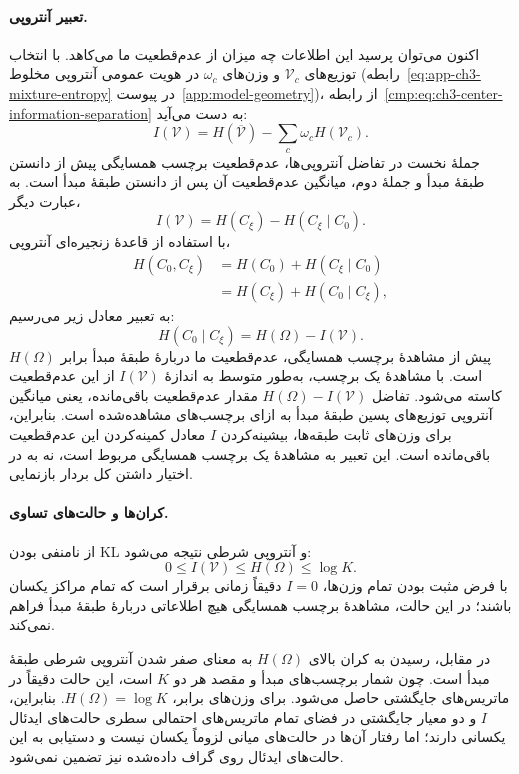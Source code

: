 \paragraph{تعبیر آنتروپی.}
اکنون می‌توان پرسید این اطلاعات چه میزان از
عدم‌قطعیت ما می‌کاهد. با انتخاب توزیع‌های
$\mathcal V_c$ و وزن‌های $\omega_c$ در هویت
عمومی آنتروپی مخلوط
(رابطه~\eqref{eq:app-ch3-mixture-entropy} در
پیوست~\ref{app:model-geometry})، از
رابطه~\eqref{cmp:eq:ch3-center-information-separation}
به دست می‌آید:
\[
I(\mathcal V)
=H(\overline{\mathcal V})-\sum_c\omega_c H(\mathcal V_c).
\]
جملهٔ نخست در تفاضل آنتروپی‌ها، عدم‌قطعیت
برچسب همسایگی پیش از دانستن طبقهٔ مبدأ و
جملهٔ دوم، میانگین عدم‌قطعیت آن پس از دانستن
طبقهٔ مبدأ است. به عبارت دیگر،
\[
I(\mathcal V)=H(C_\xi)-H(C_\xi\mid C_0).
\]
با استفاده از قاعدهٔ زنجیره‌ای آنتروپی،
\[
\begin{aligned}
H(C_0,C_\xi)&=H(C_0)+H(C_\xi\mid C_0)\\
&=H(C_\xi)+H(C_0\mid C_\xi),
\end{aligned}
\]
به تعبیر معادل زیر می‌رسیم:
\[
\boxed{H(C_0\mid C_\xi)=H(\Omega)-I(\mathcal V).}
\]
پیش از مشاهدهٔ برچسب همسایگی، عدم‌قطعیت
ما دربارهٔ طبقهٔ مبدأ برابر $H(\Omega)$ است.
با مشاهدهٔ یک برچسب، به‌طور متوسط به اندازهٔ
$I(\mathcal V)$ از این عدم‌قطعیت کاسته می‌شود.
تفاضل $H(\Omega)-I(\mathcal V)$ مقدار
عدم‌قطعیت باقی‌مانده، یعنی میانگین آنتروپی
توزیع‌های پسین طبقهٔ مبدأ به ازای برچسب‌های
مشاهده‌شده است. بنابراین، برای وزن‌های ثابت
طبقه‌ها، بیشینه‌کردن $I$ معادل کمینه‌کردن
این عدم‌قطعیت باقی‌مانده است. این تعبیر به
مشاهدهٔ یک برچسب همسایگی مربوط است، نه
به در اختیار داشتن کل بردار بازنمایی.

\paragraph{کران‌ها و حالت‌های تساوی.}
از نامنفی بودن KL و آنتروپی شرطی نتیجه می‌شود:
\[
\boxed{0\le I(\mathcal V)\le H(\Omega)\le\log K.}
\]
با فرض مثبت بودن تمام وزن‌ها، $I=0$ دقیقاً
زمانی برقرار است که تمام مراکز یکسان باشند؛
در این حالت، مشاهدهٔ برچسب همسایگی هیچ
اطلاعاتی دربارهٔ طبقهٔ مبدأ فراهم نمی‌کند.

در مقابل، رسیدن به کران بالای $H(\Omega)$
به معنای صفر شدن آنتروپی شرطی طبقهٔ مبدأ
است. چون شمار برچسب‌های مبدأ و مقصد هر دو
$K$ است، این حالت دقیقاً در ماتریس‌های
جایگشتی حاصل می‌شود. برای وزن‌های برابر،
$H(\Omega)=\log K$. بنابراین، $I$ و دو
معیار جایگشتی در فضای تمام ماتریس‌های احتمالی
سطری حالت‌های ایدئال یکسانی دارند؛ اما رفتار
آن‌ها در حالت‌های میانی لزوماً یکسان نیست
و دستیابی به این حالت‌های ایدئال روی گراف
داده‌شده نیز تضمین نمی‌شود.

